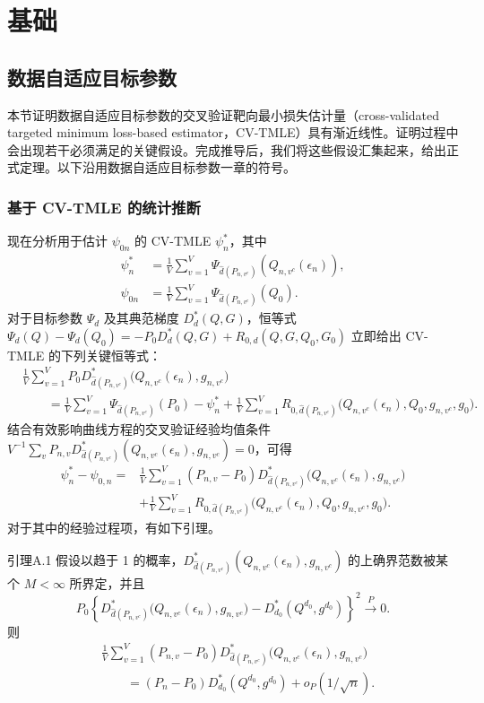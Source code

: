 
\providecommand{\appAd}{\widehat d(P_{n,v^c})}
\chapter{基础}
\label{app:foundations}
\section{数据自适应目标参数}

本节证明数据自适应目标参数的交叉验证靶向最小损失估计量（cross-validated targeted minimum loss-based estimator，CV-TMLE）具有渐近线性。证明过程中会出现若干必须满足的关键假设。完成推导后，我们将这些假设汇集起来，给出正式定理。以下沿用数据自适应目标参数一章的符号。

\subsection{基于 CV-TMLE 的统计推断}

现在分析用于估计 $\psi_{0n}$ 的 CV-TMLE $\psi_n^*$，其中
\[
\begin{aligned}
\psi_n^*&=\frac1V\sum_{v=1}^V\Psi_{\appAd}(Q_{n,v^c}(\epsilon_n)),\\
\psi_{0n}&=\frac1V\sum_{v=1}^V\Psi_{\appAd}(Q_0).
\end{aligned}
\]
对于目标参数 $\Psi_d$ 及其典范梯度 $D_d^*(Q,G)$，恒等式
$\Psi_d(Q)-\Psi_d(Q_0)=-P_0D_d^*(Q,G)+R_{0,d}(Q,G,Q_0,G_0)$
立即给出 CV-TMLE 的下列关键恒等式：
\[
\begin{aligned}
&\frac1V\sum_{v=1}^V P_0D^*_{\appAd}
 \bigl(Q_{n,v^c}(\epsilon_n),g_{n,v^c}\bigr)\\
&\qquad=\frac1V\sum_{v=1}^V\Psi_{\appAd}(P_0)-\psi_n^*
 +\frac1V\sum_{v=1}^V R_{0,\appAd}
 \bigl(Q_{n,v^c}(\epsilon_n),Q_0,g_{n,v^c},g_0\bigr).
\end{aligned}
\]
结合有效影响曲线方程的交叉验证经验均值条件
$V^{-1}\sum_vP_{n,v}D^*_{\appAd}(Q_{n,v^c}(\epsilon_n),g_{n,v^c})=0$，可得
\[
\begin{aligned}
\psi_n^*-\psi_{0,n}
={}&\frac1V\sum_{v=1}^V(P_{n,v}-P_0)
 D^*_{\appAd}\bigl(Q_{n,v^c}(\epsilon_n),g_{n,v^c}\bigr)\\
&+\frac1V\sum_{v=1}^V R_{0,\appAd}
 \bigl(Q_{n,v^c}(\epsilon_n),Q_0,g_{n,v^c},g_0\bigr).
\end{aligned}
\]
对于其中的经验过程项，有如下引理。

\begin{bookresult}{引理}{A.1}
假设以趋于 1 的概率，$D^*_{\appAd}(Q_{n,v^c}(\epsilon_n),g_{n,v^c})$ 的上确界范数被某个 $M<\infty$ 所界定，并且
\[
P_0\left\{D^*_{\appAd}\bigl(Q_{n,v^c}(\epsilon_n),g_{n,v^c}\bigr)
 -D^*_{d_0}(Q^{d_0},g^{d_0})\right\}^2
 \xrightarrow{P}0.
\]
则
\[
\begin{aligned}
&\frac1V\sum_{v=1}^V(P_{n,v}-P_0)
 D^*_{\appAd}\bigl(Q_{n,v^c}(\epsilon_n),g_{n,v^c}\bigr)\\
&\qquad=(P_n-P_0)D^*_{d_0}(Q^{d_0},g^{d_0})+o_P(1/\sqrt n).
\end{aligned}
\]
\end{bookresult}

